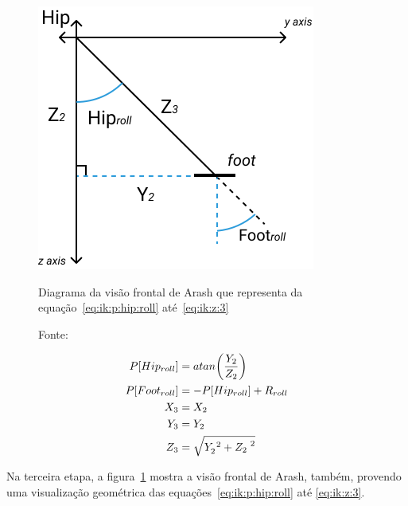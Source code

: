 \begin{figure}[htb]
	\centering
	\includegraphics[scale=1.5]{imagens/svg/inverse-kinematics-frontalview}
	\caption{Diagrama da visão frontal de Arash que representa da equação~\ref{eq:ik:p:hip:roll} até~\ref{eq:ik:z:3}}
	\caption*{Fonte: \cite{karimionline}}
	\label{fig:ik:frontalview}
\end{figure}

\begin{align}
	 P[Hip_{roll}] &= atan\bigg(\dfrac{Y_2}{Z_2}\bigg)                    \label{eq:ik:p:hip:roll}     \\
	P[Foot_{roll}] &= -P[Hip_{roll}] + R_{roll}                            \label{eq:ik:p:foot:roll}    \\
			   X_3 &= X_2                                                   \label{eq:ik:x:3}            \\
			   Y_3 &= Y_2                                                    \label{eq:ik:y:3}            \\
	           Z_3 &= \sqrt{Y_2^{\hspace{1mm}2} + {Z_2}^{\hspace{1mm}2}}      \label{eq:ik:z:3}
\end{align}

Na terceira etapa, a figura~\ref{fig:ik:frontalview} mostra a visão frontal de Arash, também, provendo uma visualização geométrica das equações~\ref{eq:ik:p:hip:roll} até \ref{eq:ik:z:3}.

